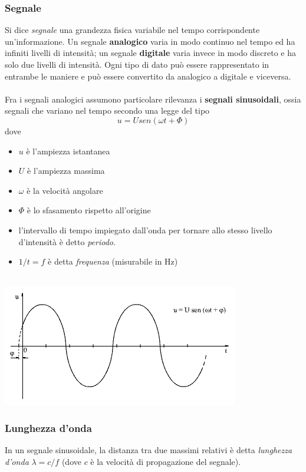 \documentclass[a4paper,11pt]{paper}
\begin{document}
\subsubsection{Segnale}
Si dice \textit{segnale} una grandezza fisica variabile nel tempo corrispondente un'informazione. Un segnale \textbf{analogico} varia in modo continuo nel tempo ed ha infiniti livelli di intensità; un segnale \textbf{digitale} varia invece in modo discreto e ha solo due livelli di intensità. Ogni tipo di dato può essere rappresentato in entrambe le maniere e può essere convertito da analogico a digitale e viceversa.
\\\\Fra i segnali analogici assumono particolare rilevanza i \textbf{segnali sinusoidali}, ossia segnali che variano nel tempo secondo una legge del tipo \[u=Usen(\omega t+\Phi )\] dove 
\begin{itemize}
\item $u$ è l'ampiezza istantanea
\item $U$ è l'ampiezza massima
\item $\omega $ è la velocità angolare %
\item $\Phi $ è lo sfasamento rispetto all'origine
\item l'intervallo di tempo impiegato dall'onda per tornare allo stesso livello d'intensità è detto \textit{periodo}.
\item $1/t=f$ è detta \textit{frequenza} (misurabile in Hz)\\\\
\end{itemize}
\includegraphics[scale=0.5]{segnali_sin.png}
\subsubsection{Lunghezza d'onda}
In un segnale sinusoidale, la distanza tra due massimi relativi è detta \textit{lunghezza d'onda} $\lambda =c/f$ (dove $c$ è la velocità di propagazione del segnale).
\end{document}
